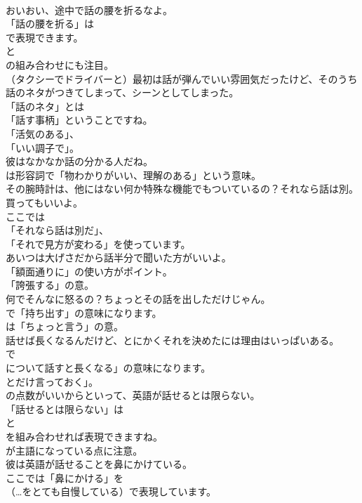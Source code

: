 \documentclass[8pt]{extreport}
\begin{document}
\begin{CJK}{UTF8}{min}
\\	おいおい、途中で話の腰を折るなよ。 
\\	「話の腰を折る」は 
\\	で表現できます。
\\	と 
\\	の組み合わせにも注目。	
\\	（タクシーでドライバーと）最初は話が弾んでいい雰囲気だったけど、そのうち話のネタがつきてしまって、シーンとしてしまった。 
\\	「話のネタ」とは
\\	「話す事柄」ということですね。
\\	「活気のある」、
\\	「いい調子で」。	
\\	彼はなかなか話の分かる人だね。 
\\	は形容詞で「物わかりがいい、理解のある」という意味。	
\\	その腕時計は、他にはない何か特殊な機能でもついているの？それなら話は別。買ってもいいよ。 
\\	ここでは
\\	「それなら話は別だ」、
\\	「それで見方が変わる」を使っています。	
\\	あいつは大げさだから話半分で聞いた方がいいよ。 
\\	「額面通りに」の使い方がポイント。
\\	「誇張する」の意。	
\\	何でそんなに怒るの？ちょっとその話を出しただけじゃん。 
\\	で「持ち出す」の意味になります。
\\	は「ちょっと言う」の意。	
\\	話せば長くなるんだけど、とにかくそれを決めたには理由はいっぱいある。 
\\	で
\\	について話すと長くなる」の意味になります。
\\	とだけ言っておく」。	
\\	の点数がいいからといって、英語が話せるとは限らない。 
\\	「話せるとは限らない」は
\\	と
\\	を組み合わせれば表現できますね。
\\	が主語になっている点に注意。	
\\	彼は英語が話せることを鼻にかけている。 
\\	ここでは「鼻にかける」を 
\\	（…をとても自慢している）で表現しています。

\end{CJK}
\end{document}

